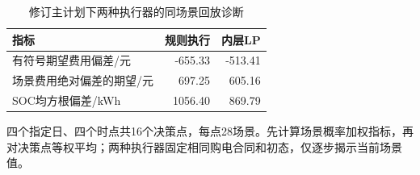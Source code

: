 \begin{table}[htbp]\centering\small
\caption{修订主计划下两种执行器的同场景回放诊断}
\label{tab:v2_inner_gap}
\begin{tabularx}{\linewidth}{LRR}\toprule
指标 & 规则执行 & 内层LP\\\midrule
有符号期望费用偏差/元 & -655.33 & -513.41\\
场景费用绝对偏差的期望/元 & 697.25 & 605.16\\
SOC均方根偏差/kWh & 1056.40 & 869.79\\
\bottomrule\end{tabularx}
\par\smallskip\parbox{\linewidth}{\footnotesize 四个指定日、四个时点共16个决策点，每点28场景。先计算场景概率加权指标，再对决策点等权平均；两种执行器固定相同购电合同和初态，仅逐步揭示当前场景值。}
\end{table}